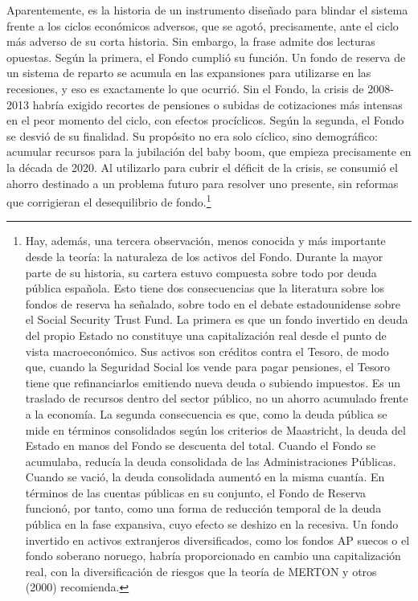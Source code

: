 \documentclass[10pt,a4paper]{article}
\begin{document}
Aparentemente, es la historia de un instrumento diseñado para blindar el sistema frente a los ciclos económicos adversos, que se agotó, precisamente, ante el ciclo más adverso de su corta historia. Sin embargo, la frase admite dos lecturas opuestas. Según la primera, el Fondo cumplió su función. Un fondo de reserva de un sistema de reparto se acumula en las expansiones para utilizarse en las recesiones, y eso es exactamente lo que ocurrió. Sin el Fondo, la crisis de 2008-2013 habría exigido recortes de pensiones o subidas de cotizaciones más intensas en el peor momento del ciclo, con efectos procíclicos. Según la segunda, el Fondo se desvió de su finalidad. Su propósito no era solo cíclico, sino demográfico: acumular recursos para la jubilación del baby boom, que empieza precisamente en la década de 2020. Al utilizarlo para cubrir el déficit de la crisis, se consumió el ahorro destinado a un problema futuro para resolver uno presente, sin reformas que corrigieran el desequilibrio de fondo.\footnote{%
    Hay, además, una tercera observación, menos conocida y más importante desde la teoría: la naturaleza de los activos del Fondo. Durante la mayor parte de su historia, su cartera estuvo compuesta sobre todo por deuda pública española. Esto tiene dos consecuencias que la literatura sobre los fondos de reserva ha señalado, sobre todo en el debate estadounidense sobre el Social Security Trust Fund. La primera es que un fondo invertido en deuda del propio Estado no constituye una capitalización real desde el punto de vista macroeconómico. Sus activos son créditos contra el Tesoro, de modo que, cuando la Seguridad Social los vende para pagar pensiones, el Tesoro tiene que refinanciarlos emitiendo nueva deuda o subiendo impuestos. Es un traslado de recursos dentro del sector público, no un ahorro acumulado frente a la economía. La segunda consecuencia es que, como la deuda pública se mide en términos consolidados según los criterios de Maastricht, la deuda del Estado en manos del Fondo se descuenta del total. Cuando el Fondo se acumulaba, reducía la deuda consolidada de las Administraciones Públicas. Cuando se vació, la deuda consolidada aumentó en la misma cuantía. En términos de las cuentas públicas en su conjunto, el Fondo de Reserva funcionó, por tanto, como una forma de reducción temporal de la deuda pública en la fase expansiva, cuyo efecto se deshizo en la recesiva. Un fondo invertido en activos extranjeros diversificados, como los fondos AP suecos o el fondo soberano noruego, habría proporcionado en cambio una capitalización real, con la diversificación de riesgos que la teoría de MERTON y otros (2000) recomienda.
}
\end{document}
